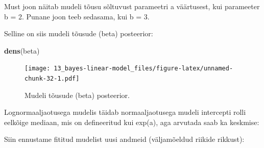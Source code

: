 \documentclass[]{book}
\newenvironment{Shaded}{\begin{snugshade}}{\end{snugshade}}
\newcommand{\KeywordTok}[1]{\textcolor[rgb]{0.13,0.29,0.53}{\textbf{#1}}}
\newcommand{\DecValTok}[1]{\textcolor[rgb]{0.00,0.00,0.81}{#1}}
\newcommand{\StringTok}[1]{\textcolor[rgb]{0.31,0.60,0.02}{#1}}
\newcommand{\CommentTok}[1]{\textcolor[rgb]{0.56,0.35,0.01}{\textit{#1}}}
\newcommand{\OperatorTok}[1]{\textcolor[rgb]{0.81,0.36,0.00}{\textbf{#1}}}
\newcommand{\NormalTok}[1]{#1}
\begin{document}
Must joon näitab mudeli tõusu sõltuvust parameetri a väärtusest, kui
parameeter b = 2. Punane joon teeb sedasama, kui b = 3.

Selline on siis mudeli tõusude (beta) posteerior:

\begin{Shaded}
\end{Shaded}

\begin{Shaded}
\begin{Highlighting}[]
\KeywordTok{dens}\NormalTok{(beta)}
\end{Highlighting}
\end{Shaded}

\begin{figure}
\centering
\texttt{[image: 13\_bayes-linear-model\_files/figure-latex/unnamed-chunk-32-1.pdf]}
\caption{\label{fig:unnamed-chunk-32}Mudeli tõusude (beta) posteerior.}
\end{figure}

Lognormaaljaotusega mudelis täidab normaaljaotusega mudeli intercepti
rolli eelkõige mediaan, mis on defineeritud kui exp(a), aga arvutada
saab ka keskmise:

\begin{Shaded}
\end{Shaded}

Siin ennustame fititud mudelist uusi andmeid (väljamõeldud riikide
rikkust):
\end{document}
